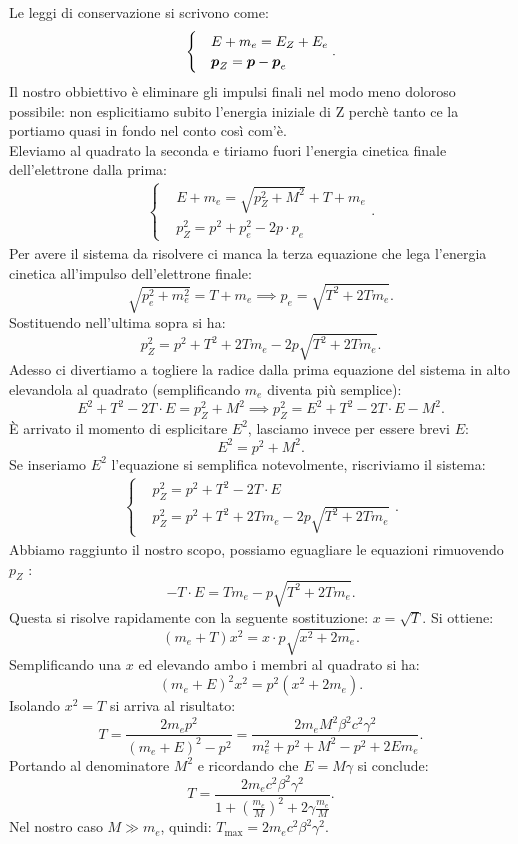 Le leggi di conservazione si scrivono come:
\begin{align*}
	\begin{cases}
	&E + m_{e} = E_{Z} + E_{e}\\
	&\boldsymbol{p}_{Z} = \boldsymbol{p} - \boldsymbol{p}_{e}
	\end{cases}
.\end{align*}
Il nostro obbiettivo è eliminare gli impulsi finali nel modo meno doloroso possibile: non esplicitiamo subito l'energia iniziale di Z perchè tanto ce la portiamo quasi in fondo nel conto così com'è.\\
Eleviamo al quadrato la seconda e tiriamo fuori l'energia cinetica finale dell'elettrone dalla prima:
\begin{align*}
	\begin{cases}
	&E + m_{e} = \sqrt{p_{Z}^2+M^2} + T + m_{e}\\
	&p_{Z}^2=p^2+p_{e}^2-2p\cdot p_{e}
	\end{cases}
.\end{align*} 
Per avere il sistema da risolvere ci manca la terza equazione che lega l'energia cinetica all'impulso dell'elettrone finale:
\[
	\sqrt{p_{e}^2+m_{e}^2} = T + m_{e}\implies p_{e} = \sqrt{T^2+2Tm_{e}} 
.\] 
Sostituendo nell'ultima sopra si ha:
\[
	p_{Z}^2=p^2 + T^2 +2Tm_{e} -2 p\sqrt{T^2 + 2Tm_{e}}
.\] 
Adesso ci divertiamo a togliere la radice dalla prima equazione del sistema in alto elevandola al quadrato (semplificando $m_{e}$ diventa più semplice):
\[
	E^2+T^2-2T\cdot E = p_{Z}^2 + M^2 \implies p_{Z}^2 = E^2 +T^2 -2T\cdot E - M^2 
.\] 
È arrivato il momento di esplicitare $E^2$, lasciamo invece per essere brevi $E$:
 \[
	E^2 = p^2 + M^2 
.\] 
Se inseriamo $E^2$ l'equazione si semplifica notevolmente, riscriviamo il sistema:
\begin{align*}
	\begin{cases}
		& p_{Z}^2 = p^2 +T^2 -2T\cdot E\\
		& p_{Z}^2 = p^2 + T^2 + 2Tm_{e} -2p\sqrt{T^2 + 2Tm_{e}} 
	\end{cases}
.\end{align*}
Abbiamo raggiunto il nostro scopo, possiamo eguagliare le equazioni rimuovendo $p_{Z}$ :
\[
	-T\cdot E = Tm_{e} - p \sqrt{T^2 + 2 Tm_{e}} 
.\] 
Questa si risolve rapidamente con la seguente sostituzione: $x = \sqrt{T}$. Si ottiene:
\[
	\left( m_{e} + T \right)x^2 = x\cdot p\sqrt{ x^2 + 2 m_{e}} 
.\] 
Semplificando una $x$ ed elevando ambo i membri al quadrato si ha:
\[
	\left( m_{e} + E \right)^2 x^2 = p^2\left( x^2 + 2m_{e} \right) 
.\] 
Isolando $x^2 = T$ si arriva al risultato:
\[
	T = \frac{2m_{e}p^2}{\left( m_{e}+E\right)^2- p^2} = \frac{2m_{e} M^2\beta^2c^2\gamma^2}{m_{e}^2 + p^2 + M^2 - p^2 + 2Em_{e}}
.\] 
Portando al denominatore $M^2$ e ricordando che $E = M\gamma$ si conclude:
\[
	T = \frac{2m_{e}c^2\beta^2\gamma^2}{1+ \left(\frac{m_{e}}{M}\right)^2 + 2\gamma \frac{m_{e}}{M} }
.\] 
Nel nostro caso $M \gg m_{e}$, quindi: $T_{\text{max}}=2m_ec^2\beta^2\gamma^2$.


